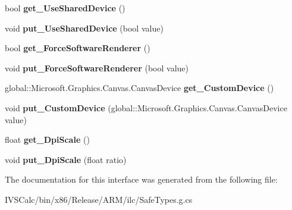 \begin{DoxyCompactItemize}
bool {\bfseries get\+\_\+\+Use\+Shared\+Device} ()
\item 
\mbox{\label{interface_microsoft_1_1_graphics_1_1_canvas_1_1_u_i_1_1_xaml_1_1_i_canvas_control_a66c9173d29e17dbbb7b5ef1b315bd7a8}} 
void {\bfseries put\+\_\+\+Use\+Shared\+Device} (bool value)
\item 
\mbox{\label{interface_microsoft_1_1_graphics_1_1_canvas_1_1_u_i_1_1_xaml_1_1_i_canvas_control_a62be2aa017fd1aa2d0100789a5dbd557}} 
bool {\bfseries get\+\_\+\+Force\+Software\+Renderer} ()
\item 
\mbox{\label{interface_microsoft_1_1_graphics_1_1_canvas_1_1_u_i_1_1_xaml_1_1_i_canvas_control_adb46fbfbe0e98392df3ff1ebdbfe650d}} 
void {\bfseries put\+\_\+\+Force\+Software\+Renderer} (bool value)
\item 
\mbox{\label{interface_microsoft_1_1_graphics_1_1_canvas_1_1_u_i_1_1_xaml_1_1_i_canvas_control_a662ab7bd653827c7b276b057e9eab211}} 
global\+::\+Microsoft.\+Graphics.\+Canvas.\+Canvas\+Device {\bfseries get\+\_\+\+Custom\+Device} ()
\item 
\mbox{\label{interface_microsoft_1_1_graphics_1_1_canvas_1_1_u_i_1_1_xaml_1_1_i_canvas_control_a4da1f97d13f825f768730d9598d88902}} 
void {\bfseries put\+\_\+\+Custom\+Device} (global\+::\+Microsoft.\+Graphics.\+Canvas.\+Canvas\+Device value)
\item 
\mbox{\label{interface_microsoft_1_1_graphics_1_1_canvas_1_1_u_i_1_1_xaml_1_1_i_canvas_control_aa82b042e077fa0bf256753af653fd201}} 
float {\bfseries get\+\_\+\+Dpi\+Scale} ()
\item 
\mbox{\label{interface_microsoft_1_1_graphics_1_1_canvas_1_1_u_i_1_1_xaml_1_1_i_canvas_control_a6e1d54ce91aed2c4bb4394e089748342}} 
void {\bfseries put\+\_\+\+Dpi\+Scale} (float ratio)
\end{DoxyCompactItemize}


The documentation for this interface was generated from the following file\+:\begin{DoxyCompactItemize}
\item 
I\+V\+S\+Calc/bin/x86/\+Release/\+A\+R\+M/ilc/Safe\+Types.\+g.\+cs\end{DoxyCompactItemize}
